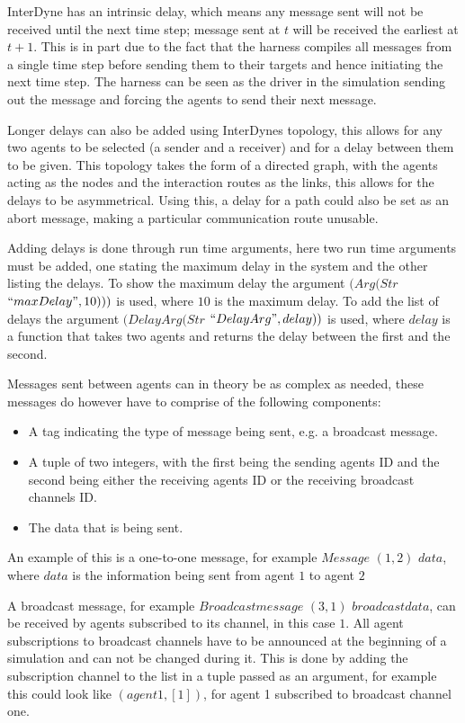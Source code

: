 \documentclass{article}
\begin{document}
InterDyne has an intrinsic delay, which means any message sent will not be received until the next time step; message sent at $t$ will be received the earliest at $t+1$. This is in part due to the fact that the harness compiles all messages from a single time step before sending them to their targets and hence initiating the next time step. The harness can be seen as the driver in the simulation sending out the message and forcing the agents to send their next message.   

Longer delays can also be added using InterDynes topology, this allows for any two agents to be selected (a sender and a receiver) and for a delay between them to be given. This topology takes the form of a directed graph, with the agents acting as the nodes and the interaction routes as the links, this allows for the delays to be asymmetrical. Using this, a delay for a path could also be set as an abort message, making a particular communication route unusable.  

Adding delays is done through run time arguments, here two run time arguments must be added, one stating the maximum delay in the system and the other listing the delays. To show the maximum delay the argument $(Arg (Str$  $``maxDelay", 10)))$ is used, where $10$ is the maximum delay. To add the list of delays the argument $(DelayArg (Str$  $``DelayArg", delay))$ is used, where $delay$ is a function that takes two agents and returns the delay between the first and the second. 

Messages sent between agents can in theory be as complex as needed, these messages do however have to comprise of the following components: 
\begin{itemize}
   \item A tag indicating the type of message being sent, e.g. a broadcast message.
   \item A tuple of two integers, with the first being the sending agents ID and the second being either the receiving agents ID or the receiving broadcast channels ID.  
   \item The data that is being sent. 
\end{itemize}
An example of this is a one-to-one message, for example $Message$ $(1, 2)$ $data$, where $data$ is the information being sent from agent $1$ to agent $2$ 

A broadcast message, for example $Broadcastmessage$ $(3, 1)$ $broadcastdata$, can be received by agents subscribed to its channel, in this case $1$. All agent subscriptions to broadcast channels have to be announced at the beginning of a simulation and can not be changed during it. This is done by adding the subscription channel to the list in a tuple passed as an argument, for example this could look like $(agent1, [1])$, for agent 1 subscribed to broadcast channel one.
\end{document}
